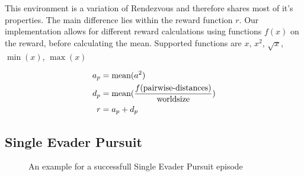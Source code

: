 This environment is a variation of Rendezvous and therefore shares most of it's properties. The main difference lies within the reward function $r$. Our implementation allows for different reward calculations using functions $f(x)$ on the reward, before calculating the mean. Supported functions are $x$, $x^2$, $\sqrt{x}$, $\min(x)$, $\max(x)$

\begin{equation}
    \begin{aligned}
        a_p &= \textup{mean}(a^2)\\
        d_p &= \textup{mean}(\frac{f(\textup{pairwise-distances})}{\textup{worldsize}}) \\
        r &= a_p + d_p
    \end{aligned}
    \nonumber
\end{equation}



\subsection{Single Evader Pursuit}
\label{sec:Single Evader Pursuit}
\begin{figure}[htp]
    \centering
    \hspace{1cm}                       
    \caption{An example for a successfull Single Evader Pursuit episode}
    \label{fig:single_evader_example}
\end{figure}

